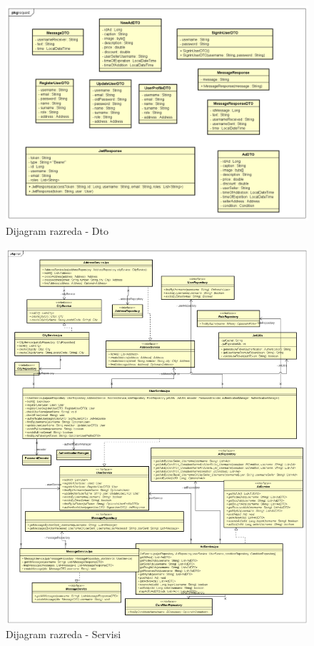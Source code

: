 	\begin{figure}[H]
		\includegraphics[scale=0.5]{slike/Dto.PNG} %
		\centering
		\caption{Dijagram razreda - Dto}
		\label{fig:Dto}
	\end{figure}

\begin{figure}[H]
	\includegraphics[scale=0.38]{slike/Servisi.PNG} %
	\centering
	\caption{Dijagram razreda - Servisi}
	\label{fig:Servisi}
\end{figure}
		

